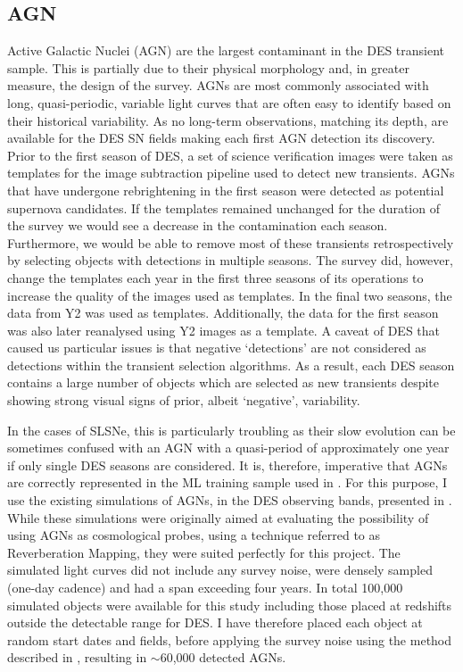 \subsection{AGN}
Active Galactic Nuclei (AGN) are the largest contaminant in the DES transient sample. This is partially due to their physical morphology and, in greater measure, the design of the survey. AGNs are most commonly associated with long, quasi-periodic, variable light curves that are often easy to identify based on their historical variability. As no long-term observations, matching its depth, are available for the DES SN fields making each first AGN detection its discovery. Prior to the first season of DES, a set of science verification images were taken as templates for the image subtraction pipeline used to detect new transients. AGNs that have undergone rebrightening in the first season were detected as potential supernova candidates. If the templates remained unchanged for the duration of the survey we would see a decrease in the contamination each season. Furthermore, we would be able to remove most of these transients retrospectively by selecting objects with detections in multiple seasons. The survey did, however, change the templates each year in the first three seasons of its operations to increase the quality of the images used as templates. In the final two seasons, the data from Y2 was used as templates. Additionally, the data for the first season was also later reanalysed using Y2 images as a template. A caveat of DES that caused us particular issues is that negative `detections' are not considered as detections within the transient selection algorithms. As a result, each DES season contains a large number of objects which are selected as new transients despite showing strong visual signs of prior, albeit `negative', variability.

In the cases of SLSNe, this is particularly troubling as their slow evolution can be sometimes confused with an AGN with a quasi-period of approximately one year if only single DES seasons are considered. It is, therefore, imperative that AGNs are correctly represented in the ML training sample used in . For this purpose, I use the existing simulations of AGNs, in the DES observing bands, presented in \citet{Honig2016}. While these simulations were originally aimed at evaluating the possibility of using AGNs as cosmological probes, using a technique referred to as Reverberation Mapping, they were suited perfectly for this project. The simulated light curves did not include any survey noise, were densely sampled (one-day cadence) and had a span exceeding four years. In total 100,000 simulated objects were available for this study including those placed at redshifts outside the detectable range for DES. I have therefore placed each object at random start dates and fields, before applying the survey noise using the method described in , resulting in $\sim$60,000 detected AGNs.

